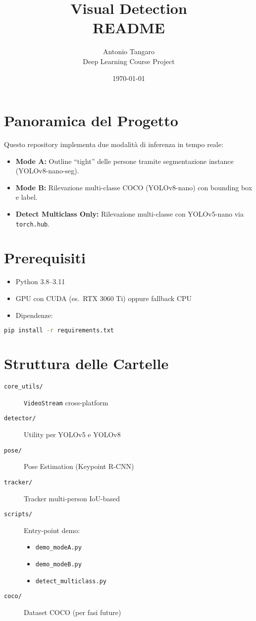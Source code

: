 \documentclass[11pt]{article}
\title{\bfseries Visual Detection \\ README}
\author{Antonio Tangaro \\ \small Deep Learning Course Project}
\date{\today}
\begin{document}
\maketitle

\section*{Panoramica del Progetto}
Questo repository implementa due modalità di inferenza in tempo reale:
\begin{itemize}
  \item \textbf{Mode A:} Outline “tight” delle persone tramite segmentazione instance (YOLOv8-nano-seg).
  \item \textbf{Mode B:} Rilevazione multi-classe COCO (YOLOv8-nano) con bounding box e label.
  \item \textbf{Detect Multiclass Only:} Rilevazione multi-classe con YOLOv5-nano via \texttt{torch.hub}.
\end{itemize}

\section*{Prerequisiti}
\begin{itemize}
  \item Python 3.8--3.11
  \item GPU con CUDA (es.\ RTX 3060 Ti) oppure fallback CPU
  \item Dipendenze:
\end{itemize}

\begin{lstlisting}[language=bash,caption={Installazione dipendenze}]
pip install -r requirements.txt
\end{lstlisting}

\section*{Struttura delle Cartelle}
\begin{description}
  \item[\texttt{core\_utils/}] \texttt{VideoStream} cross-platform
  \item[\texttt{detector/}] Utility per YOLOv5 e YOLOv8
  \item[\texttt{pose/}] Pose Estimation (Keypoint R-CNN)
  \item[\texttt{tracker/}] Tracker multi-person IoU-based
  \item[\texttt{scripts/}] Entry-point demo:
    \begin{itemize}
      \item \texttt{demo\_modeA.py}
      \item \texttt{demo\_modeB.py}
      \item \texttt{detect\_multiclass.py}
    \end{itemize}
  \item[\texttt{coco/}] Dataset COCO (per fasi future)
\end{description}
\end{document}
